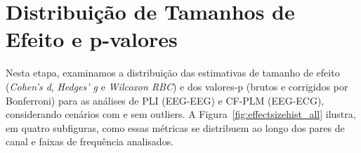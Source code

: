 \section{Distribuição de Tamanhos de Efeito e p-valores}
\label{sec:effect_size_distribution}
Nesta etapa, examinamos a distribuição das estimativas de tamanho de efeito (\emph{Cohen's d}, \emph{Hedges' g} e \emph{Wilcoxon RBC}) e dos valores-p (brutos e corrigidos por Bonferroni) para as análises de PLI (EEG-EEG) e CF-PLM (EEG-ECG), considerando cenários com e sem outliers. A Figura~\ref{fig:effectsizehist_all} ilustra, em quatro subfiguras, como essas métricas se distribuem ao longo dos pares de canal e faixas de frequência analisados.

\begin{figure}[htb]
    \centering
    \quad
    \\
\end{figure}
